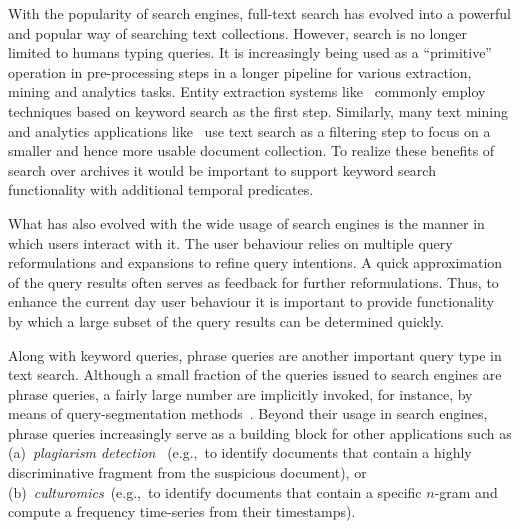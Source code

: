 With the popularity of search engines, full-text search has evolved into a powerful and popular way of searching text collections. However, search is no longer limited to humans typing queries. It is increasingly being used as a ``primitive'' operation in pre-processing steps in a longer pipeline for various extraction, mining and analytics tasks. Entity extraction systems like~\cite{agrawalCCG:vldb08, KanhabuaN10} commonly employ techniques based on keyword search as the first step. Similarly, many text mining and analytics applications like~\cite{time_explorer:hcir2010, Setty:2010:IEI:1920841.1921050} use text search as a filtering step to focus on a smaller and hence more usable document collection. To realize these benefits of search over archives it would be important to support keyword search functionality with additional temporal predicates.


What has also evolved with the wide usage of search engines is the manner in which users interact with it. The user behaviour relies on multiple query reformulations and expansions to refine query intentions. A quick approximation of the query results often serves as feedback for further reformulations. Thus, to enhance the current day user behaviour it is important to provide functionality by which a large subset of the query results can be determined quickly.





Along with keyword queries, phrase queries are another important query type in text search. Although a small fraction of the queries issued to search engines are phrase queries, a fairly large number are implicitly invoked, for instance, by means of query-segmentation methods~\cite{Hagen:2012fk,Li:2011kx}. Beyond their usage in search engines, phra\-se queries increasingly serve as a building block for other applications such as (a)~\emph{plagiarism detection}~\cite{Stamatatos:2011uq} (e.g.,~to identify documents that contain a highly discriminative fragment from the suspicious document), or (b)~\emph{culturomics}~\cite{Michel:ys}(e.g.,~to identify documents that contain a specific $n$-gram and compute a frequency time-series from their timestamps).

